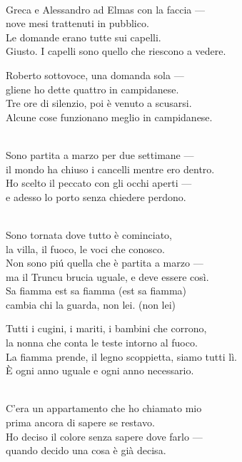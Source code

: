 \begin{lyrics}


\\
Greca e Alessandro ad Elmas con la faccia —\\
nove mesi trattenuti in pubblico.\\
Le domande erano tutte sui capelli.
\\
Giusto. I capelli sono quello che riescono a vedere.

Roberto sottovoce, una domanda sola —\\
gliene ho dette quattro in campidanese.\\
Tre ore di silenzio, poi è venuto a scusarsi.
\\
Alcune cose funzionano meglio in campidanese.

\\
Sono partita a marzo per due settimane —\\
il mondo ha chiuso i cancelli mentre ero dentro.\\
Ho scelto il peccato con gli occhi aperti —\\
e adesso lo porto senza chiedere perdono.

\\
Sono tornata dove tutto è cominciato,\\
la villa, il fuoco, le voci che conosco.\\
Non sono piú quella che è partita a marzo —\\
ma il Truncu brucia uguale, e deve essere così.
\\
Sa fiamma est sa fiamma (est sa fiamma)\\
cambia chi la guarda, non lei. (non lei)

Tutti i cugini, i mariti, i bambini che corrono,\\
la nonna che conta le teste intorno al fuoco.\\
La fiamma prende, il legno scoppietta, siamo tutti lì.
\\
È ogni anno uguale e ogni anno necessario.

\\
C'era un appartamento che ho chiamato mio\\
prima ancora di sapere se restavo.\\
Ho deciso il colore senza sapere dove farlo —\\
quando decido una cosa è già decisa.


\end{lyrics}
